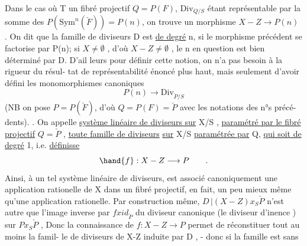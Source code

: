 Dans le cas où T  un fibré projectif $Q=P(F)$, $\mathrm{Div}_{Q/S}$
étant représentable par la somme des $P(\mathrm{Sym}^n(\check{F})) = P(n)$, on trouve
un morphisme $X-Z \longrightarrow P(n)$ . On dit que la famille de diviseurs
D est \uline{de degré} n, si le morphisme précédent se factorise par P(n); si
$X \neq \emptyset$ , d'où $X-Z \neq \emptyset$ , le n en question est bien déterminé par D. D'ail%
leurs pour définir cette notion, on n'a pas besoin à la rigueur du résul-%
tat de représentabilité énoncé plus haut, mais seulement d'avoir défini
les monomorphismes canoniques
\[ P(n) \longrightarrow \mathrm{Div}_{\check{P}/S} \]
(NB on pose $P = P(\check{F})$, d'où $Q = P(F) = \check{P}$ avec les notations des n°s précé-%
dents). . On appelle \uline{système linéaire de diviseurs sur} X/S , \uline{paramétré
par le fibré projectif} $Q = \check{P}$ , \uline{toute famille de diviseurs} \uline{sur} X/S
\uline{paramétrée par} Q, \uline{qui soit de degré} 1, i.e. \uline{définisse}
\[ \hand{f} : X-Z \longrightarrow P \qquad . \]
Ainsi, à un tel système  linéaire de diviseurs, est associé canoniquement
une application rationelle de X dans un fibré projectif, \hand{(}en fait, un peu
mieux même qu'une application rationelle\hand{)}. Par construction même,
$D\,|(X-Z)x_S\check{P}$ n'est autre que l'image inverse par $f x id_{\check{P}}$ du diviseur
canonique (le diviseur d'inence ) sur $Px_S\check{P}$ , Donc la connaissance
de $f: X-Z \longrightarrow P$ permet de réconstituer  tout au moins la famil-%
le de diviseurs de X-Z induite par D , - donc si la famille est sans

